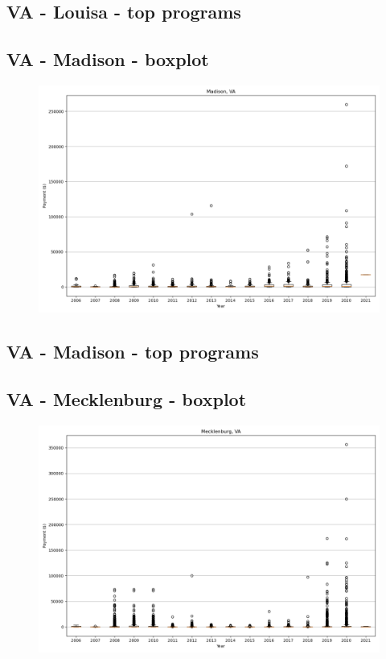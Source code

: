\subsection*{VA - Louisa - top programs}

\newpage
\subsection*{VA - Madison - boxplot}
\begin{figure}[h]
\centering
\includegraphics[width=7in]{../output/boxplots/counties/Madison-VA_boxplot.png}
\end{figure}


\subsection*{VA - Madison - top programs}

\newpage
\subsection*{VA - Mecklenburg - boxplot}
\begin{figure}[h]
\centering
\includegraphics[width=7in]{../output/boxplots/counties/Mecklenburg-VA_boxplot.png}
\end{figure}


